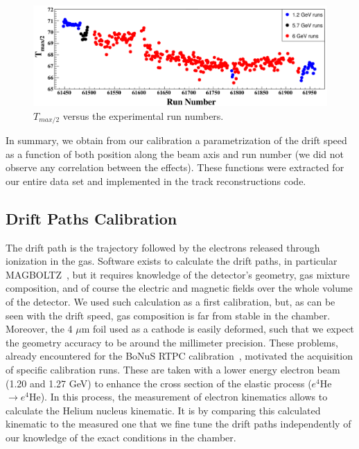 \documentclass[twocolumn,showpacs,superscriptaddress,groupedaddress]{revtex4}
\begin{document}
\begin{figure}[tb]
\centering
\includegraphics[width=16.5cm]{fig_2017/Drift_run_number.pdf}
\caption{$T_{max/2}$ versus the experimental run numbers.} 
\label{fig:Drift_run_number_1}
\end{figure}


In summary, we obtain from our calibration a parametrization of the drift speed 
as a function of both position along the beam axis and run number (we did not 
observe any correlation between the effects). These 
functions were extracted for our entire data set and implemented in the 
track reconstructions code.
   
\subsection{Drift Paths Calibration}

The drift path is the trajectory followed by the electrons released through 
ionization in the gas. Software exists to calculate the drift paths, in particular
MAGBOLTZ~\cite{MAGBOLTZ}, but it requires knowledge of the detector's 
geometry, gas mixture composition, and of course the electric and magnetic 
fields over the whole volume of the detector. We used such calculation as a 
first calibration, but, 
as can be seen with the drift speed, gas composition is far from stable in the 
chamber. Moreover, the 4 $\mu$m foil used as a cathode is easily deformed, such
that we expect the geometry accuracy to be around the millimeter precision. 
These problems, already 
encountered for the BoNuS RTPC calibration~\cite{BONUS-NIM}, motivated the 
acquisition of specific calibration runs. These are taken with a lower energy 
electron beam (1.20 and 1.27 GeV) to enhance the cross section of the elastic 
process ($e^{4}$He$\rightarrow e^{4}$He). In this process, the measurement of
electron kinematics allows to calculate the Helium nucleus kinematic. It is
by comparing this calculated kinematic to the measured one that we fine tune
the drift paths independently of our knowledge of the exact conditions in the 
chamber.
\end{document}
